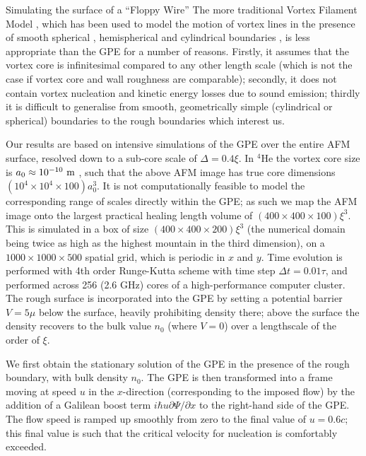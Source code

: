 \begin{chapter}{\label{cha:afm}Simulating the surface of a ``Floppy Wire''}
The more traditional Vortex Filament Model \cite{Schwarz1988},
which has been used to model the motion of vortex lines in the presence of
smooth spherical \cite{Hanninen-sphere,Kivotides-sphere},
hemispherical \cite{Schwarz-1981-pinning,Tsubota-1994-pinning} 
and cylindrical boundaries \cite{Hanninen-PNAS,Goto2008}, 
is less appropriate than the GPE for a number of reasons.
Firstly, it assumes that the vortex core is infinitesimal compared to 
any other length scale (which is not the case if
vortex core and wall roughness are comparable);
secondly, it does not contain vortex nucleation and kinetic energy losses due
to sound emission; thirdly it is difficult to 
generalise from smooth, geometrically simple (cylindrical or spherical)
boundaries to the rough boundaries which interest us.

Our results are based on intensive simulations of the GPE over the entire AFM surface, resolved down to a sub-core scale of $\Delta=0.4\xi$.  In $^4$He the vortex core size is $a_0 \approx 10^{-10}~\rm m$ \cite{Rayfield1964}, such that the above AFM image has true core dimensions $(10^4 \times 10^4 \times 100) a_0^3$.  It is not computationally feasible to model the corresponding range of scales directly within the GPE; as such we map the AFM image onto the largest practical healing length volume of $(400 \times 400 \times 100) \xi^3$.  This is simulated in a box of size $(400 \times 400 \times 200) \xi^3$ (the numerical domain being twice as high as the highest mountain in the third dimension), on a $1000\times 1000\times 500$ spatial grid, which is periodic in $x$ and $y$.  Time evolution is performed with 4th order Runge-Kutta scheme
with time step $\Delta t=0.01 \tau $, and performed across 256 (2.6 GHz) cores of a high-performance {computer} cluster.  The rough surface is incorporated into the GPE by setting a potential barrier $V=5\mu$ below the surface, heavily prohibiting density there; above the surface the density recovers to the bulk value $n_0$ (where $V=0$) over a lengthscale of the order of $\xi$. 

We first obtain the stationary solution of the GPE in the presence of
the rough boundary, with bulk density $n_0$.  The GPE is then transformed into a frame moving at speed $u$ in the $x$-direction (corresponding to the imposed flow) by the addition of a Galilean boost term $ i \hbar u \partial \Psi/\partial x$ to the right-hand side of the GPE.  The flow speed {is}
ramped up smoothly from zero to the final value of $u=0.6 c$; this final value is such that the critical velocity for nucleation is comfortably exceeded. 


\end{chapter}
